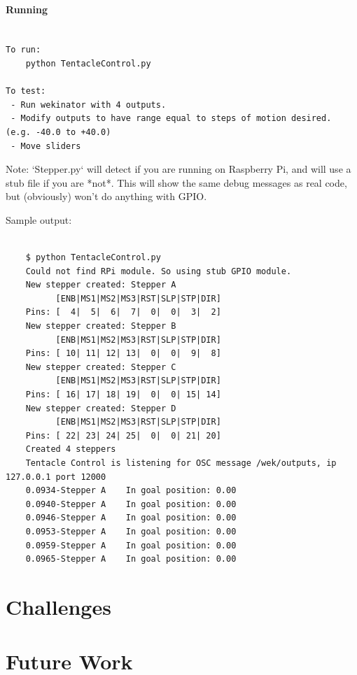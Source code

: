 \documentclass[12pt,a4paper]{article}
\begin{document}
\paragraph{Running}

\begin{lstlisting}

To run:
    python TentacleControl.py

To test:
 - Run wekinator with 4 outputs.
 - Modify outputs to have range equal to steps of motion desired. (e.g. -40.0 to +40.0)
 - Move sliders
 \end{lstlisting}

\hfill \break
Note: `Stepper.py` will detect if you are running on Raspberry Pi, and will use a stub file if you are *not*. This will show the same debug messages as real code, but (obviously) won't do anything with GPIO.

\hfill \break
Sample output: 
\begin{lstlisting}

	$ python TentacleControl.py
	Could not find RPi module. So using stub GPIO module.
	New stepper created: Stepper A
	      [ENB|MS1|MS2|MS3|RST|SLP|STP|DIR]
	Pins: [  4|  5|  6|  7|  0|  0|  3|  2]
	New stepper created: Stepper B
	      [ENB|MS1|MS2|MS3|RST|SLP|STP|DIR]
	Pins: [ 10| 11| 12| 13|  0|  0|  9|  8]
	New stepper created: Stepper C
	      [ENB|MS1|MS2|MS3|RST|SLP|STP|DIR]
	Pins: [ 16| 17| 18| 19|  0|  0| 15| 14]
	New stepper created: Stepper D
	      [ENB|MS1|MS2|MS3|RST|SLP|STP|DIR]
	Pins: [ 22| 23| 24| 25|  0|  0| 21| 20]
	Created 4 steppers
	Tentacle Control is listening for OSC message /wek/outputs, ip 127.0.0.1 port 12000
	0.0934-Stepper A	In goal position: 0.00
	0.0940-Stepper A	In goal position: 0.00
	0.0946-Stepper A	In goal position: 0.00
	0.0953-Stepper A	In goal position: 0.00
	0.0959-Stepper A	In goal position: 0.00
	0.0965-Stepper A	In goal position: 0.00

\end{lstlisting}
\section{Challenges}

\section{Future Work}
\end{document}
